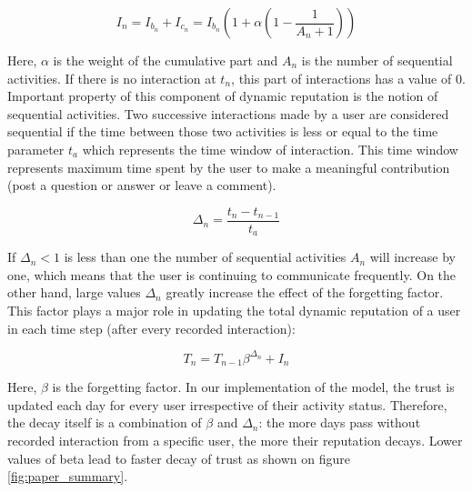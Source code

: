 \begin{equation}\label{eq:ibn}
I_n = I_{b_{n}} + I_{c_{n}} = I_{b_{n}} (1+  \alpha  (1-\frac{1}{A_{n}+1}))
\end{equation}

Here, $\alpha$ is the weight of the cumulative part and $A_{n}$ is the number of sequential activities. If there is no interaction at $t_n$, this part of interactions has a value of 0. Important property of this component of dynamic reputation is the notion of sequential activities. Two successive interactions made by a user are considered sequential if the time between those two activities is less or equal to the time parameter $t_{a}$ which represents the time window of interaction. This time window represents maximum time spent by the user to make a meaningful contribution (post a question or answer or leave a comment).

\begin{equation}\label{eq:deltan}
\Delta_{n}=\frac{t_{n}-t_{n-1}}{t_{a}}
\end{equation}

If $\Delta_{n} < 1$ is less than one the number of sequential activities $A_{n}$ will increase by one, which means that the user is continuing to communicate frequently. On the other hand, large values $\Delta_{n}$ greatly increase the effect of the forgetting factor. This factor plays a major role in updating the total dynamic reputation of a user in each time step (after every recorded interaction):

\begin{equation}\label{eq:tn}
T_{n}=T_{n-1} \beta^{\Delta_{n}}+I_{n}
\end{equation}

Here, $\beta$ is the forgetting factor. In our implementation of the model, the trust is updated each day for every user irrespective of their activity status. Therefore, the decay itself is a combination of $\beta$ and $\Delta_n$: the more days pass without recorded interaction from a specific user, the more their reputation decays. Lower values of beta lead to faster decay of trust as shown on figure \ref{fig:paper_summary}.
















